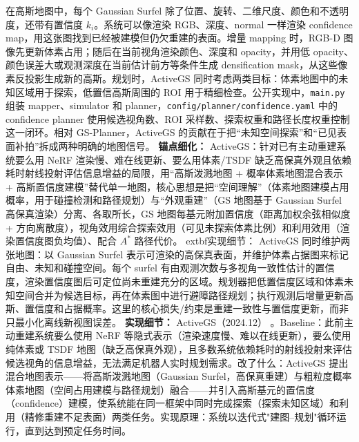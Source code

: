 在高斯地图中，每个 Gaussian Surfel 除了位置、旋转、二维尺度、颜色和不透明度，还带有置信度 $k_i$。系统可以像渲染 RGB、深度、normal 一样渲染 confidence map，用这张图找到已经被建模但仍欠重建的表面。增量 mapping 时，RGB-D 图像先更新体素占用；随后在当前视角渲染颜色、深度和 opacity，并用低 opacity、颜色误差大或观测深度在当前估计前方等条件生成 densification mask，从这些像素反投影生成新的高斯。规划时，ActiveGS 同时考虑两类目标：体素地图中的未知区域用于探索，低置信高斯周围的 ROI 用于精细检查。公开实现中，\texttt{main.py} 组装 mapper、simulator 和 planner，\texttt{config/planner/confidence.yaml} 中的 confidence planner 使用候选视角数、ROI 采样数、探索权重和路径长度权重控制这一闭环。相对 GS-Planner，ActiveGS 的贡献在于把“未知空间探索”和“已见表面补拍”拆成两种明确的地图信号。
\textbf{锚点细化：} ActiveGS：针对已有主动重建系统要么用 NeRF 渲染慢、难在线更新、要么用体素/TSDF 缺乏高保真外观且依赖耗时射线投射评估信息增益的局限，用``高斯泼溅地图 + 概率体素地图混合表示 + 高斯置信度建模''替代单一地图，核心思想是把``空间理解''（体素地图建模占用概率，用于碰撞检测和路径规划）与``外观重建''（GS 地图基于 Gaussian Surfel 高保真渲染）分离、各取所长，GS 地图每基元附加置信度（距离加权余弦相似度 + 方向离散度），视角效用综合探索效用（可见未探索体素比例）和利用效用（渲染置信度图负均值）、配合 $A^*$ 路径代价。
	extbf{实现细节：} ActiveGS 同时维护两张地图：以 Gaussian Surfel 表示可渲染的高保真表面，并维护体素占据图来标记自由、未知和碰撞空间。每个 surfel 有由观测次数与多视角一致性估计的置信度，渲染置信度图后可定位尚未重建充分的区域。规划器把低置信度区域和体素未知空间合并为候选目标，再在体素图中进行避障路径规划；执行观测后增量更新高斯、置信度和占据概率。这里的核心损失/约束是重建一致性与置信度更新，而非只最小化离线新视图误差。
\textbf{实现细节：} ActiveGS（2024.12） 。Baseline：此前主动重建系统要么使用 NeRF 等隐式表示（渲染速度慢、难以在线更新），要么使用纯体素或 TSDF 地图（缺乏高保真外观），且多数系统依赖耗时的射线投射来评估候选视角的信息增益，无法满足机器人实时规划需求。改了什么：ActiveGS 提出混合地图表示——将高斯泼溅地图（Gaussian Surfel，高保真重建）与粗粒度概率体素地图（空间占用建模与路径规划）融合——并引入高斯基元的置信度（confidence）建模，使系统能在同一框架中同时完成探索（探索未知区域）和利用（精修重建不足表面）两类任务。实现原理：系统以迭代式"建图--规划"循环运行，直到达到预定任务时间。%
